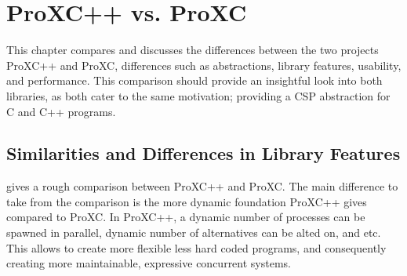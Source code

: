 

\chapter{ProXC++ vs. ProXC}
\label{ch:proxc++_vs_proxc}

This chapter compares and discusses the differences between the two projects ProXC++ and ProXC, differences such as abstractions, library features, usability, and performance. This comparison should provide an insightful look into both libraries, as both cater to the same motivation; providing a CSP abstraction for C and C++ programs.

\section{Similarities and Differences in Library Features}

 gives a rough comparison between ProXC++ and ProXC. The main difference to take from the comparison is the more dynamic foundation ProXC++ gives compared to ProXC. In ProXC++, a dynamic number of processes can be spawned in parallel, dynamic number of alternatives can be alted on, and etc. This allows to create more flexible less hard coded programs, and consequently creating more maintainable, expressive concurrent systems.

